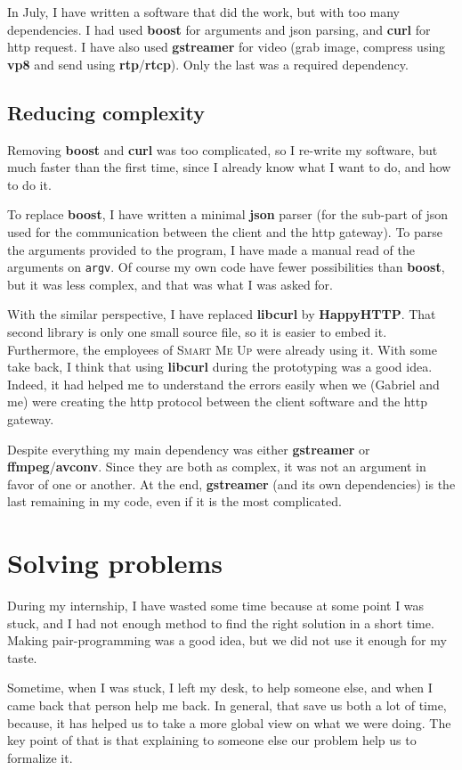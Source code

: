 \documentclass[a4paper,11pt]{custom}
\newcommand{\smu}{\textsc{Smart Me Up}}
\newcommand{\rtp}{\textbf{rtp}\xspace}
\newcommand{\rtcp}{\textbf{rtcp}\xspace}
\newcommand{\avconv}{\textbf{avconv}\xspace}
\newcommand{\ffmpeg}{\textbf{ffmpeg}\xspace}
\newcommand{\gstreamer}{\textbf{gstreamer}\xspace}
\newcommand{\curl}{\textbf{curl}\xspace}
\newcommand{\boost}{\textbf{boost}\xspace}
\newcommand{\happyhttp}{\textbf{HappyHTTP}\xspace}
\newcommand{\libcurl}{\textbf{libcurl}\xspace}
\newcommand{\vpx}{\textbf{vp8}\xspace}
\newcommand{\json}{\textbf{json}\xspace}
\begin{document}
In July, I have written a software that did the work, but with too many
dependencies. I had used \boost{} for arguments and json parsing, and \curl{}
for http request. I have also used \gstreamer{} for video (grab image, compress
using \vpx{} and send using \rtp/\rtcp). Only the last was a required
dependency.

\subsection{Reducing complexity}
\label{sec:complexity}

Removing \boost{} and \curl{} was too complicated, so I re-write my software,
but much faster than the first time, since I already know what I want to do, and
how to do it.

To replace \boost{}, I have written a minimal \json{} parser (for the sub-part of
json used for the communication between the client and the http gateway).
To parse the arguments provided to the program, I have made a manual read of
the arguments on \verb+argv+. Of course my own code have fewer possibilities than
\boost{}, but it was less complex, and that was what I was asked for.

With the similar perspective, I have replaced \libcurl{} by \happyhttp. That second
library is only one small source file, so it is easier to embed it. Furthermore,
the employees of \smu{} were already using it. With some take back, I think that
using \libcurl{} during the prototyping was a good idea. Indeed, it had helped me to
understand the errors easily when we (Gabriel and me) were creating the http
protocol between the client software and the http gateway.

Despite everything my main dependency was either \gstreamer{} or
\ffmpeg/\avconv. Since they are both as complex, it was not an argument in
favor of one or another. At the end, \gstreamer{} (and its own dependencies) is
the last remaining in my code, even if it is the most complicated.

\section{Solving problems}

During my internship, I have wasted some time because at some point I was stuck,
and I had not enough method to find the right solution in a short time. Making
pair-programming was a good idea, but we did not use it enough for my taste.

Sometime, when I was stuck, I left my desk, to help someone else, and when I
came back that person help me back. In general, that save us both a lot of time,
because, it has helped us to take a more global view on what we were doing. The key
point of that is that explaining to someone else our problem help us to
formalize it.
\end{document}
